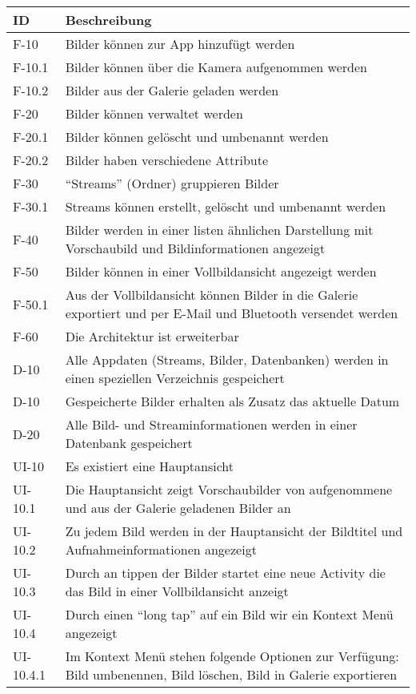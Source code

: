 \begin{center}
\begin{longtable}{|l|p{12cm}|}
\toprule
\textbf{ID} & \textbf{Beschreibung} \\
\hline
\endhead
\hline
\endfoot
F-10 & Bilder können zur App hinzufügt werden\\
F-10.1 & Bilder können über die Kamera aufgenommen werden\\
F-10.2 & Bilder aus der Galerie geladen werden\\
F-20 & Bilder können verwaltet werden\\
F-20.1 & Bilder können gelöscht und umbenannt werden\\
F-20.2 & Bilder haben verschiedene Attribute\\
F-30 & \enquote{Streams} (Ordner) gruppieren Bilder\\
F-30.1 & Streams können erstellt, gelöscht und umbenannt werden\\
F-40 & Bilder werden in einer listen ähnlichen Darstellung mit Vorschaubild und Bildinformationen angezeigt\\
F-50 & Bilder können in einer Vollbildansicht angezeigt werden\\
F-50.1 & Aus der Vollbildansicht können Bilder in die Galerie exportiert und per E-Mail und Bluetooth versendet werden\\
F-60 & Die Architektur ist erweiterbar\\
\hline
D-10 & Alle Appdaten (Streams, Bilder, Datenbanken) werden in einen speziellen Verzeichnis gespeichert\\
D-10 & Gespeicherte Bilder erhalten als Zusatz das aktuelle Datum\\
D-20 & Alle Bild- und Streaminformationen werden in einer Datenbank gespeichert\\
\hline
UI-10 &  Es existiert eine Hauptansicht\\
UI-10.1 &  Die Hauptansicht zeigt Vorschaubilder von aufgenommene und aus der Galerie geladenen Bilder an\\
UI-10.2 &  Zu jedem Bild werden in der Hauptansicht der Bildtitel und Aufnahmeinformationen angezeigt\\
UI-10.3 &  Durch an tippen der Bilder startet eine neue Activity die das Bild in einer Vollbildansicht anzeigt\\
UI-10.4 &  Durch einen \enquote{long tap} auf ein Bild wir ein Kontext Menü angezeigt\\
UI-10.4.1 & Im Kontext Menü stehen folgende Optionen zur Verfügung: Bild umbenennen, Bild löschen, Bild in Galerie exportieren\\

\end{longtable}
\end{center}
